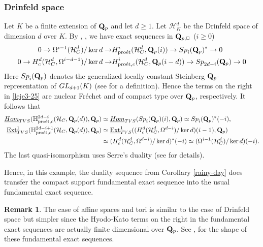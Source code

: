 \documentclass[10pt,reqno]{amsart}
\theoremstyle{definition}
\newtheorem{remark}[equation]{Remark}
\theoremstyle{remark}
\newcommand{\proeet}{\operatorname{pro\acute{e}t} }
\newcommand{\uHom}{\underline{{\rm{Hom}} }}
\newcommand{\Ext}{\operatorname{Ext} }
\numberwithin{equation}{section}
\def\Q{{\bf Q}} \def\Z{{\bf Z}}
\numberwithin{equation}{section}
\begin{document}
\subsubsection{Drinfeld space}
 Let $K$ be a finite extension of $\Q_p$ and let $d\geq 1$. Let ${\mathcal H}^d_K$ be the Drinfeld space of dimension $d$ over $K$.
By \cite[Th. 1.3]{CDN3}, \cite[Lemma 8.13]{AGN}, we have exact sequences in $\Q_{p,\Box}$ ($i\geq 0$)
\begin{align}\label{leje3-25}
 0\to \Omega^{i-1}({\mathcal H}^d_C)/\ker d\to  & H^i_{\proeet}({\mathcal H}^d_C,\Q_p(i))\to {\rm Sp}_i(\Q_p)^*\to 0\\
 0\to H^d_c({\mathcal H}^d_C, \Omega^{i-d-1})/\ker d\to & H^i_{\proeet,c}({\mathcal H}^d_C,\Q_p(i-d))\to {\rm Sp}_{2d-i}(\Q_p)\to 0\notag
\end{align}
Here ${\rm Sp}_i(\Q_p)$ denotes the generalized locally constant Steinberg $\Q_p$-representation of ${\rm GL}_{d+1}(K)$ (see \cite[Sec.\,5.2.1]{CDN3} for a definition). Hence the terms on the right in \eqref{leje3-25} are nuclear Fr\'echet and of compact type over $\Q_p$, respectively. It follows that
\begin{align*}
 \uHom_{\rm TVS}({\mathbb H}^{2d-i}_{\proeet,c}({\mathcal H}_C,\Q_p(d)),\Q_p) & \simeq \uHom_{\rm TVS}({\rm Sp}_{i}(\Q_p)(i),\Q_p)\simeq {\rm Sp}_{i}(\Q_p)^*(-i),\\
 \underline{\Ext}^1_{\rm TVS}({\mathbb H}^{2d-i+1}_{\proeet,c}({\mathcal H}_C,\Q_p(d)),\Q_p) & \simeq \underline{\Ext}^1_{\rm TVS}( (H^d_c({\mathcal H}^d_C, \Omega^{d-i})/\ker d)(i-1),\Q_p)\\ & \simeq (H^d_c({\mathcal H}^d_C, \Omega^{d-i})/\ker d)^*(-i)\simeq
(\Omega^{i-1}({\mathcal H}^d_C)/\ker d)(-i).
\end{align*}
The last quasi-isomorphism uses Serre's duality (see \cite[Remark 8.11]{AGN} for details).

  Hence, in this example, the duality sequence from Corollary \ref{rainy-day} does transfer the compact support fundamental exact sequence into the usual fundamental exact sequence. 
  \begin{remark}
The case of affine spaces and tori is similar to the case of Drinfeld space 
but simpler since the Hyodo-Kato terms on the right in the fundamental exact sequences are actually finite dimensional over $\Q_p$. 
See \cite[Prop.\,4.17]{CDN3}, \cite[Sec.\,7.1]{AGN} for the shape of these fundamental exact sequences. 
  \end{remark}


{\Small
\printindex
}
\end{document}
